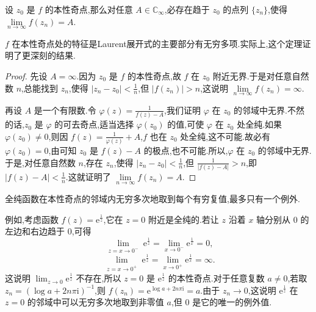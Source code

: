 \documentclass[../../main.tex]{subfiles}
\begin{document}
\begin{theorem}[Weierstrass定理]\label{theorem:Weierstrass-定理5.2.5}
设 \( z_0 \) 是 \( f \) 的本性奇点,那么对任意 \( A \in \mathbb{C}_{\infty} \),必存在趋于 \( z_0 \) 的点列 \( \{ z_n \} \),使得 \( \lim\limits_{n \to \infty} f(z_n) = A \).
\end{theorem}
\begin{remark}
\( f \) 在本性奇点处的特征是Laurent展开式的主要部分有无穷多项.实际上,这个定理证明了更深刻的结果.
\end{remark}
\begin{proof}
先设 \( A = \infty \).因为 \( z_0 \) 是 \( f \) 的本性奇点,故 \( f \) 在 \( z_0 \) 附近无界.于是对任意自然数 \( n \),总能找到 \( z_n \),使得 \( |z_n - z_0| < \frac{1}{n} \),但 \( |f(z_n)| > n \),这说明 \( \lim\limits_{n \to \infty} f(z_n) = \infty \).

再设 \( A \) 是一个有限数.令 \( \varphi(z) = \frac{1}{f(z) - A} \),我们证明 \( \varphi \) 在 \( z_0 \) 的邻域中无界.不然的话,\( z_0 \) 是 \( \varphi \) 的可去奇点,适当选择 \( \varphi(z_0) \) 的值,可使 \( \varphi \) 在 \( z_0 \) 处全纯.如果 \( \varphi(z_0) \neq 0 \),则因 \( f(z) = \frac{1}{\varphi(z)} + A \),\( f \) 也在 \( z_0 \) 处全纯,这不可能.故必有 \( \varphi(z_0) = 0 \),由可知 \( z_0 \) 是 \( f(z) -A\) 的极点,也不可能.所以,\( \varphi \) 在 \( z_0 \) 的邻域中无界.于是,对任意自然数 \( n \),存在 \( z_n \),使得 \( |z_n - z_0| < \frac{1}{n} \),但 \( \frac{1}{|f(z) - A|} > n \),即 \( |f(z) - A| < \frac{1}{n} \).这就证明了 \( \lim\limits_{n \to \infty} f(z_n) = A \).
\end{proof}

\begin{theorem}[Picard定理]\label{ theorem:Picard定理-定理5.2.6}
全纯函数在本性奇点的邻域内无穷多次地取到每个有穷复值,最多只有一个例外.
\end{theorem}
\begin{remark}
例如,考虑函数 \( f(z) = \mathrm{e}^{\frac{1}{z}} \),它在 \( z = 0 \) 附近是全纯的.若让 \( z \) 沿着 \( x \) 轴分别从 \( 0 \) 的左边和右边趋于 \( 0 \),可得
\[
\lim_{\substack{z = x \to 0^-}} \mathrm{e}^{\frac{1}{z}} = \lim_{x \to 0^-} \mathrm{e}^{\frac{1}{x}} = 0,
\]
\[
\lim_{\substack{z = x \to 0^+}} \mathrm{e}^{\frac{1}{z}} = \lim_{x \to 0^+} \mathrm{e}^{\frac{1}{x}} = \infty.
\]
这说明 \( \lim_{z \to 0} \mathrm{e}^{\frac{1}{z}} \) 不存在,所以 \( z = 0 \) 是 \( \mathrm{e}^{\frac{1}{z}} \) 的本性奇点.对于任意复数 \( a \neq 0 \),若取 \( z_n = (\log a + 2n\pi \mathrm{i})^{-1} \),则 \( f(z_n) = \mathrm{e}^{\log a + 2n\pi \mathrm{i}} = a \).由于 \( z_n \to 0 \),这说明 \( \mathrm{e}^{\frac{1}{z}} \) 在 \( z = 0 \) 的邻域中可以无穷多次地取到非零值 \( a \),但 \( 0 \) 是它的唯一的例外值.
\end{remark}
\end{document}

